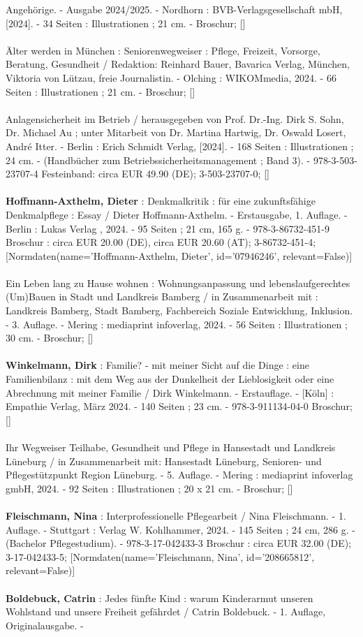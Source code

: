 \documentclass{article}
\begin{document}
\begin{multicols}{3}
Angehörige. - Ausgabe 2024/2025. - Nordhorn : BVB-Verlagsgesellschaft mbH, [2024]. - 34 Seiten : Illustrationen ; 21 cm. - Broschur; []\\\\Älter werden in München : Seniorenwegweiser : Pflege, Freizeit, Vorsorge, Beratung, Gesundheit / Redaktion:  Reinhard Bauer, Bavarica Verlag, München, Viktoria von Lützau, freie Journalistin. - Olching : WIKOMmedia, 2024. - 66 Seiten : Illustrationen ; 21 cm. - Broschur; []\\\\Anlagensicherheit im Betrieb / herausgegeben von Prof. Dr.-Ing. Dirk S. Sohn, Dr. Michael Au ; unter Mitarbeit von Dr. Martina Hartwig, Dr. Oswald Losert, André Itter. - Berlin : Erich Schmidt Verlag, [2024]. - 168 Seiten : Illustrationen ; 24 cm. - (Handbücher zum Betriebssicherheitsmanagement ; Band 3). - 978-3-503-23707-4 Festeinband: circa EUR 49.90 (DE); 3-503-23707-0; []\\\\\textbf{Hoffmann-Axthelm, Dieter} : Denkmalkritik : für eine zukunftsfähige Denkmalpflege : Essay / Dieter Hoffmann-Axthelm. - Erstausgabe, 1. Auflage. - Berlin : Lukas Verlag , 2024. - 95 Seiten ; 21 cm, 165 g. - 978-3-86732-451-9 Broschur : circa EUR 20.00 (DE), circa EUR 20.60 (AT); 3-86732-451-4; [Normdaten(name='Hoffmann-Axthelm, Dieter', id='07946246', relevant=False)]\\\\Ein Leben lang zu Hause wohnen : Wohnungsanpassung und lebenslaufgerechtes (Um)Bauen in Stadt und Landkreis Bamberg / in Zusammenarbeit mit : Landkreis Bamberg, Stadt Bamberg, Fachbereich Soziale Entwicklung, Inklusion. - 3. Auflage. - Mering : mediaprint infoverlag, 2024. - 56 Seiten : Illustrationen ; 30 cm. - Broschur; []\\\\\textbf{Winkelmann, Dirk} : Familie? - mit meiner Sicht auf die Dinge : eine Familienbilanz : mit dem Weg aus der Dunkelheit der Lieblosigkeit oder eine Abrechnung mit meiner Familie / Dirk Winkelmann. - Erstauflage. - [Köln] : Empathie Verlag, März 2024. - 140 Seiten ; 23 cm. - 978-3-911134-04-0 Broschur; []\\\\Ihr Wegweiser Teilhabe, Gesundheit und Pflege in Hansestadt und Landkreis Lüneburg / in Zusammenarbeit mit: Hansestadt Lüneburg, Senioren- und Pflegestützpunkt Region Lüneburg. - 5. Auflage. - Mering : mediaprint infoverlag gmbH, 2024. - 92 Seiten : Illustrationen ; 20 x 21 cm. - Broschur; []\\\\\textbf{Fleischmann, Nina} : Interprofessionelle Pflegearbeit / Nina Fleischmann. - 1. Auflage. - Stuttgart : Verlag W. Kohlhammer, 2024. - 145 Seiten ; 24 cm, 286 g. - (Bachelor Pflegestudium). - 978-3-17-042433-3 Broschur : circa EUR 32.00 (DE); 3-17-042433-5; [Normdaten(name='Fleischmann, Nina', id='208665812', relevant=False)]\\\\\textbf{Boldebuck, Catrin} : Jedes fünfte Kind : warum Kinderarmut unseren Wohlstand und unsere Freiheit gefährdet / Catrin Boldebuck. - 1. Auflage, Originalausgabe. - 
\end{multicols}
\end{document}
